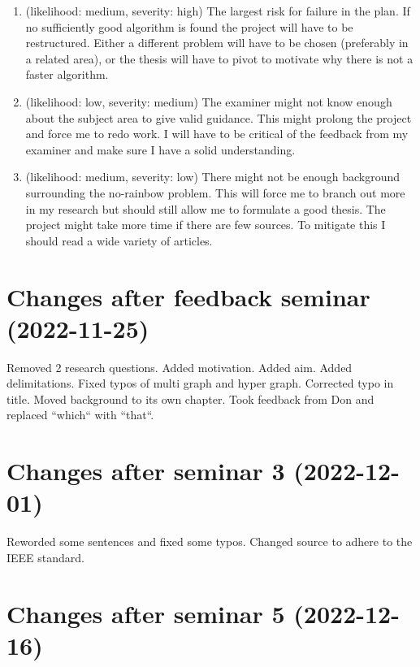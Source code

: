 \documentclass[msc,lith,english]{liuthesis}
\begin{document}
\begin{enumerate}
  \item (likelihood: medium, severity: high)
    The largest risk for failure in the plan. If no sufficiently good algorithm
    is found the project will have to be restructured. Either a different problem
    will have to be chosen (preferably in a related area), or the thesis will have
    to pivot to motivate why there is not a faster algorithm.

  \item (likelihood: low, severity: medium)
    The examiner might not know enough about the subject area to give valid
    guidance. This might prolong the project and force me to redo work. I will
    have to be critical of the feedback from my examiner and make sure I have a
    solid understanding.

  \item (likelihood: medium, severity: low)
    There might not be enough background surrounding the no-rainbow problem.
    This will force me to branch out more in my research but should still allow
    me to formulate a good thesis. The project might take more time if there
    are few sources. To mitigate this I should read a wide variety of articles.
\end{enumerate}

\printbibliography

\appendix
\chapter{Changes after feedback seminar (2022-11-25)}
Removed 2 research questions. Added motivation. Added aim. Added delimitations. Fixed typos of multi graph and hyper graph. Corrected typo in title. Moved background to its own chapter. Took feedback from Don and replaced ``which`` with ``that``.

\chapter{Changes after seminar 3 (2022-12-01)}
Reworded some sentences and fixed some typos. Changed source to adhere to the IEEE standard.

\chapter{Changes after seminar 5 (2022-12-16)}
\end{document}
